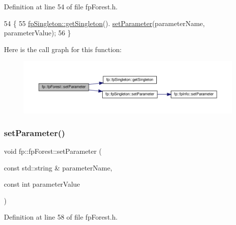 Definition at line 54 of file fp\+Forest.\+h.


\begin{DoxyCode}
54                                                                                                  \{
55                 \hyperlink{classfp_1_1fpSingleton_a8bdae77b68521003e3fc630edec2e240}{fpSingleton::getSingleton}().
      \hyperlink{classfp_1_1fpSingleton_a90f275b256694ea7b16577d547a33044}{setParameter}(parameterName, parameterValue);    
56             \}
\end{DoxyCode}
Here is the call graph for this function\+:
\nopagebreak
\begin{figure}[H]
\begin{center}
\leavevmode
\includegraphics[width=350pt]{classfp_1_1fpForest_afc7a14e083aaae0dbd90ef0a30c48c21_cgraph}
\end{center}
\end{figure}
\mbox{\label{classfp_1_1fpForest_a8a083cc4cd4110dee2b6627d53529965}} 
\subsubsection{\texorpdfstring{set\+Parameter()}{setParameter()}\hspace{0.1cm}{\footnotesize\ttfamily [3/3]}}
{\footnotesize\ttfamily void fp\+::fp\+Forest\+::set\+Parameter (\begin{DoxyParamCaption}\item[{const std\+::string \&}]{parameter\+Name,  }\item[{const int}]{parameter\+Value }\end{DoxyParamCaption})\hspace{0.3cm}{\ttfamily [inline]}}



Definition at line 58 of file fp\+Forest.\+h.


